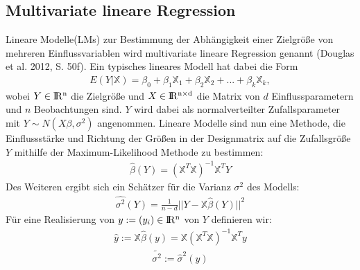 	\subsection{Multivariate lineare Regression}
	Lineare Modelle(LMs) zur Bestimmung der Abhängigkeit einer Zielgröße von mehreren Einflussvariablen wird multivariate lineare Regression genannt (Douglas et al. 2012, S. 50f). Ein typisches lineares Modell hat dabei die Form
	\begin{align}
	E(Y|\mathbb{X}) = \beta_0 + \beta_1\mathbb{X}_1 + \beta_2\mathbb{X}_2 + ... + \beta_k\mathbb{X}_k,
	\end{align}
	wobei $Y\in \rm I\!R^{n}$ die Zielgröße und $X \in \rm I\!R^{n \times d}$ die Matrix von $d$ Einflussparametern und $n$ Beobachtungen sind. $Y$ wird dabei als normalverteilter Zufallsparameter mit $ Y \sim N(X\beta, \sigma^2)$ angenommen. Lineare Modelle sind nun eine Methode, die Einflussstärke und Richtung der Größen in der Designmatrix auf die Zufallsgröße $Y$ mithilfe der Maximum-Likelihood Methode zu bestimmen:
	\begin{align}
	\hat{\beta}(Y) = (\mathbb{X}^T\mathbb{X})^{-1}\mathbb{X}^TY
	\end{align}
	Des Weiteren ergibt sich ein Schätzer für die Varianz $\sigma^2$ des Modells:
	\begin{align}
	\hat{\sigma^2}(Y) = \frac{1}{n-d}||Y-\mathbb{X}\hat{\beta}(Y)||^2
	\end{align}
	Für eine Realisierung von $y := (y_i) \in \rm I\!R^{n}$ von $Y$ definieren wir:
	\begin{align}
	\hat{y} := \mathbb{X}\hat{\beta}(y) =\mathbb{X} (\mathbb{X}^T\mathbb{X})^{-1}\mathbb{X}^Ty
	\end{align}	
	\begin{align}
	\tilde{\sigma^2}:= \hat{\sigma}^2(y)
	\end{align}

